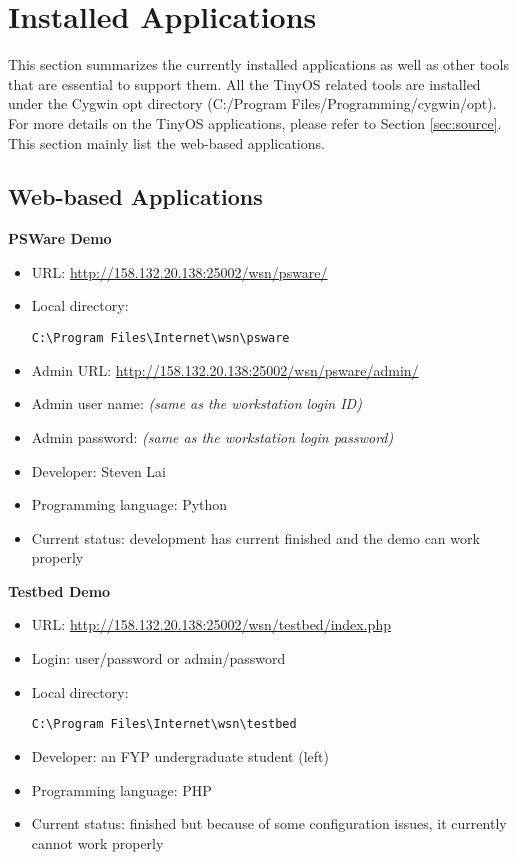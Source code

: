 \section{Installed Applications}
\label{sec:overview}
This section summarizes the currently installed applications as well as other tools that are essential to support them. All the TinyOS related tools are installed under the Cygwin opt directory (C:/Program Files/Programming/cygwin/opt). For more details on the TinyOS applications, please refer to Section \ref{sec:source}. This section mainly list the web-based applications.
\subsection{Web-based Applications}
\textbf{PSWare Demo}
\begin{itemize}
\item URL: \url{http://158.132.20.138:25002/wsn/psware/}
\item Local directory: \begin{verbatim}C:\Program Files\Internet\wsn\psware\end{verbatim}
\item Admin URL: \url{http://158.132.20.138:25002/wsn/psware/admin/}
\item Admin user name: \emph{(same as the workstation login ID)}
\item Admin password: \emph{(same as the workstation login password)}
\item Developer: Steven Lai
\item Programming language: Python
\item Current status: development has current finished and the demo can work properly
\end{itemize}
\textbf{Testbed Demo}
\begin{itemize}
\item URL: \url{http://158.132.20.138:25002/wsn/testbed/index.php}
\item Login: user/password or admin/password
\item Local directory: \begin{verbatim}C:\Program Files\Internet\wsn\testbed\end{verbatim}
\item Developer: an FYP undergraduate student (left)
\item Programming language: PHP
\item Current status: finished but because of some configuration issues, it currently cannot work properly
\end{itemize}
